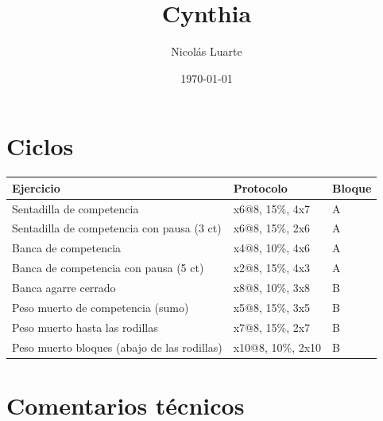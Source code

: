 \documentclass[11pt]{article}
\author{Nicolás Luarte}
\date{\today}
\title{Cynthia}
\begin{document}
\maketitle
\tableofcontents

\section{Ciclos}
\label{sec:org70f7062}
\begin{center}
\begin{tabular}{lll}
Ejercicio & Protocolo & Bloque\\
\hline
Sentadilla de competencia & x6@8, 15\%, 4x7 & A\\
Sentadilla de competencia con pausa (3 ct) & x6@8, 15\%, 2x6 & A\\
Banca de competencia & x4@8, 10\%, 4x6 & A\\
Banca de competencia con pausa (5 ct) & x2@8, 15\%, 4x3 & A\\
\hline
Banca agarre cerrado & x8@8, 10\%, 3x8 & B\\
Peso muerto de competencia (sumo) & x5@8, 15\%, 3x5 & B\\
Peso muerto hasta las rodillas & x7@8, 15\%, 2x7 & B\\
Peso muerto bloques (abajo de las rodillas) & x10@8, 10\%, 2x10 & B\\
\end{tabular}
\end{center}
\section{Comentarios técnicos}
\label{sec:org42740cb}
\end{document}
